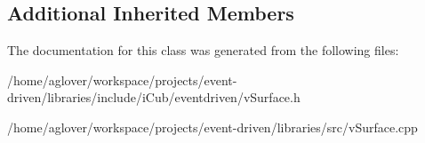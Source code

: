 \subsection*{Additional Inherited Members}


The documentation for this class was generated from the following files\+:\begin{DoxyCompactItemize}
\item 
/home/aglover/workspace/projects/event-\/driven/libraries/include/i\+Cub/eventdriven/v\+Surface.\+h\item 
/home/aglover/workspace/projects/event-\/driven/libraries/src/v\+Surface.\+cpp\end{DoxyCompactItemize}
